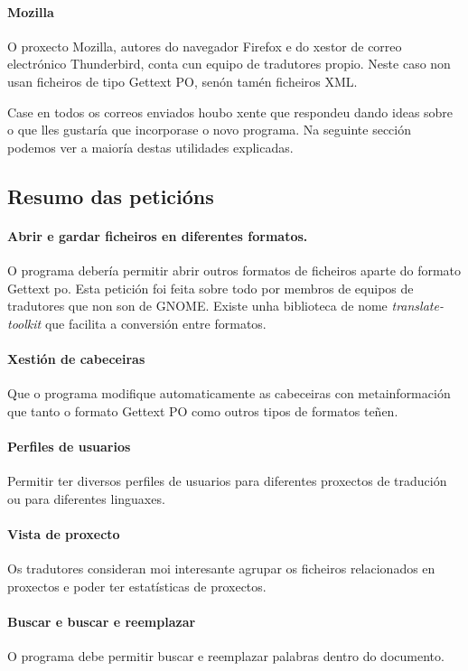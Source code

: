 \paragraph{Mozilla} O proxecto Mozilla, autores do navegador Firefox e do xestor de correo electrónico Thunderbird, conta cun equipo de tradutores propio. Neste caso non usan ficheiros de tipo Gettext PO, senón tamén ficheiros XML.

Case en todos os correos enviados houbo xente que respondeu dando ideas sobre o que lles gustaría que incorporase o novo programa. Na seguinte sección podemos ver a maioría destas utilidades explicadas.

\subsection{Resumo das peticións}
	\paragraph{Abrir e gardar ficheiros en diferentes formatos.} O programa debería permitir abrir outros formatos de ficheiros aparte do formato Gettext po. Esta petición foi feita sobre todo por membros de equipos de tradutores que non son de GNOME. Existe unha biblioteca de nome \emph{translate-toolkit} que facilita a conversión entre formatos.

	\paragraph{Xestión de cabeceiras} Que o programa modifique automaticamente as cabeceiras con metainformación que tanto o formato Gettext PO como outros tipos de formatos teñen.

	\paragraph{Perfiles de usuarios} Permitir ter diversos perfiles de usuarios para diferentes proxectos de tradución ou para diferentes linguaxes.

	\paragraph{Vista de proxecto} Os tradutores consideran moi interesante agrupar os ficheiros relacionados en proxectos e poder ter estatísticas de proxectos.

	\paragraph{Buscar e buscar e reemplazar} O programa debe permitir buscar e reemplazar palabras dentro do documento.

